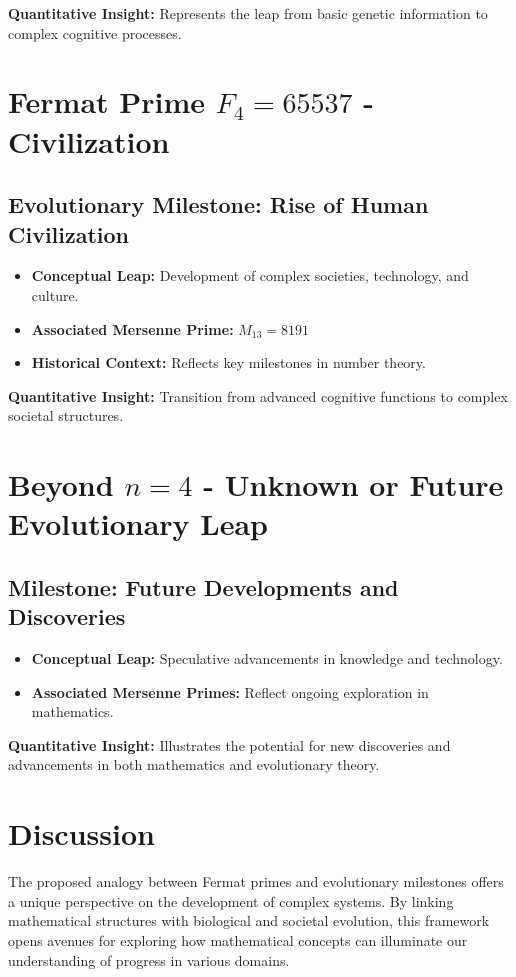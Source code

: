 \documentclass[12pt]{article}
\begin{document}
\textbf{Quantitative Insight:} Represents the leap from basic genetic information to complex cognitive processes.

\section{Fermat Prime \( F_4 = 65537 \) - Civilization}
\subsection{Evolutionary Milestone: Rise of Human Civilization}
\begin{itemize}
    \item \textbf{Conceptual Leap:} Development of complex societies, technology, and culture.
    \item \textbf{Associated Mersenne Prime:} \( M_{13} = 8191 \)
    \item \textbf{Historical Context:} Reflects key milestones in number theory.
\end{itemize}

\textbf{Quantitative Insight:} Transition from advanced cognitive functions to complex societal structures.

\section{Beyond \( n = 4 \) - Unknown or Future Evolutionary Leap}
\subsection{Milestone: Future Developments and Discoveries}
\begin{itemize}
    \item \textbf{Conceptual Leap:} Speculative advancements in knowledge and technology.
    \item \textbf{Associated Mersenne Primes:} Reflect ongoing exploration in mathematics.
\end{itemize}

\textbf{Quantitative Insight:} Illustrates the potential for new discoveries and advancements in both mathematics and evolutionary theory.

\section{Discussion}
The proposed analogy between Fermat primes and evolutionary milestones offers a unique perspective on the development of complex systems. By linking mathematical structures with biological and societal evolution, this framework opens avenues for exploring how mathematical concepts can illuminate our understanding of progress in various domains.
\end{document}
